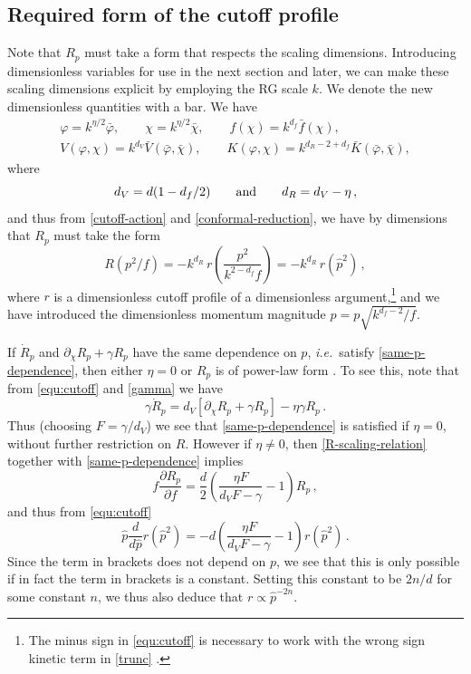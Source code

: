 \documentclass[11pt]{book} %
\newcommand\ie{\textit{i.e.}\ }
\newcommand{\dclnf}{\,\partial_\chi\! \ln\! f \,}
\newcommand{\be}{\begin{equation}}
\newcommand{\ee}{\end{equation}}
\begin{document}
\subsection{Required form of the cutoff profile}\label{sec:required-cutoff}

Note that $R_p$ must take a form that respects the scaling dimensions.
Introducing dimensionless variables for use in the next section and later,
we can make these scaling dimensions explicit by employing the RG scale $k$.
We denote the new dimensionless quantities with a bar.
We have
\begin{align}
\label{dim-vars}
	\varphi = k^{\eta/2}\bar\varphi, \qquad\chi = k^{\eta/2}\bar\chi, \qquad f(\chi) = k^{d_f}\bar f(\chi),\nonumber\\
	V(\varphi,\chi) = k^{d_V}\bar V(\bar\varphi,\bar\chi), \qquad K(\varphi, \chi) = k^{d_R- 2 + d_f} \bar  K(\bar\varphi,\bar\chi),
\end{align}
where
\be
\label{dimensions}
d_V = d(1-d_f/2)\qquad{\rm and}\qquad d_R = d_V - \eta\,,
\ee
and thus from \eqref{cutoff-action} and \eqref{conformal-reduction},
we have by dimensions that $R_p$ must take the form
\begin{equation}
\label{equ:cutoff}
	R(p^2/f)= - k^{d_R} \,r\left(\frac{p^2}{k^{2-d_f}f}\right) = - k^{d_R} \,r(\hat p^2) \,,
\end{equation}
where $r$ is a dimensionless cutoff profile of a dimensionless argument,\footnote{The minus sign in \eqref{equ:cutoff} is necessary to work with the wrong sign kinetic term in \eqref{trunc} \cite{Dietz:2015owa}.} and we have introduced the dimensionless momentum magnitude $\hat p = p\sqrt{k^{d_f-2}/f}$.

If $\dot R_p$ and $\partial_{\chi} R_p + \gamma R_p$ have the same dependence on $p$, \ie satisfy \eqref{same-p-dependence}, then either $\eta=0$ or $R_p$ is of power-law form \cite{Dietz:2015owa}. To see this, note that from \eqref{equ:cutoff} and \eqref{gamma} we have
\be
\label{R-scaling-relation}
\gamma {\dot R}_p = d_V \left[\partial_\chi R_p+\gamma R_p\right] -\eta \gamma R_p\,.
\ee
Thus (choosing $F=\gamma/d_V$) we see that \eqref{same-p-dependence} is satisfied if $\eta=0$, without further restriction on $R$. However if $\eta\ne0$, then \eqref{R-scaling-relation} together with \eqref{same-p-dependence} implies
\be
f \frac{\partial R_p}{\partial f} = \frac{d}{2}\left( \frac{\eta F}{ d_VF- \gamma} - 1\right) R_p\,,
\ee
and thus from \eqref{equ:cutoff}
\be
\hat{p} \frac{d}{d\hat{p}} r(\hat{p}^2) = -d\left( \frac{\eta F}{ d_VF- \gamma} - 1\right) r(\hat{p}^2)\,.
\ee
Since the term in brackets does not depend on $p$, we see that this is only possible if in fact the term in brackets is a constant. Setting this constant to be $2n/d$ for some constant $n$, we thus also deduce that $r\propto \hat{p}^{-2n}$.
\end{document}
